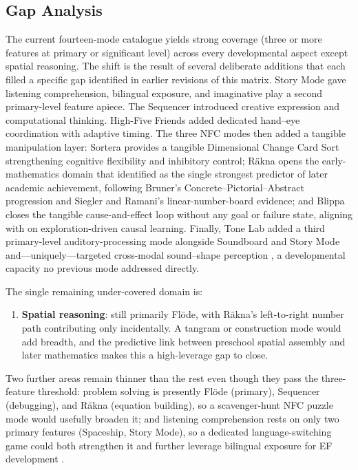 \documentclass[12pt, a4paper]{article}
\begin{document}
\subsection{Gap Analysis}
\label{sec:gaps}

The current fourteen-mode catalogue yields strong coverage (three or more
features at primary or significant level) across every developmental aspect
except spatial reasoning. The shift is the result of several deliberate
additions that each filled a specific gap identified in earlier revisions of
this matrix. Story Mode gave listening comprehension, bilingual exposure, and
imaginative play a second primary-level feature apiece. The Sequencer
introduced creative expression and computational thinking. High-Five Friends
added dedicated hand--eye coordination with adaptive timing. The three NFC
modes then added a tangible manipulation layer: Sortera provides a tangible
Dimensional Change Card Sort \citep{zelazo2006dccs} strengthening cognitive
flexibility and inhibitory control; R\"akna opens the early-mathematics
domain that \citet{duncan2007school} identified as the single strongest
predictor of later academic achievement, following Bruner's
Concrete--Pictorial--Abstract progression \citep{bruner1966instruction} and
Siegler and Ramani's \citeyearpar{siegler2009playing} linear-number-board
evidence; and Blippa closes the tangible cause-and-effect loop without any
goal or failure state, aligning with \citet{bonawitz2011double} on
exploration-driven causal learning. Finally, Tone Lab added a third
primary-level auditory-processing mode alongside Soundboard and Story Mode
and---uniquely---targeted cross-modal sound--shape perception
\citep{kohler1929gestalt, maurer2006shape, dolscheid2014thickness}, a
developmental capacity no previous mode addressed directly.

The single remaining under-covered domain is:

\begin{enumerate}[noitemsep]
  \item \textbf{Spatial reasoning}: still primarily Fl\"ode, with R\"akna's
    left-to-right number path contributing only incidentally. A tangram or
    construction mode would add breadth, and the predictive link between
    preschool spatial assembly and later mathematics
    \citep{verdine2014deconstructing} makes this a high-leverage gap to
    close.
\end{enumerate}

Two further areas remain thinner than the rest even though they pass the
three-feature threshold: problem solving is presently Fl\"ode (primary),
Sequencer (debugging), and R\"akna (equation building), so a scavenger-hunt
NFC puzzle mode would usefully broaden it; and listening comprehension rests
on only two primary features (Spaceship, Story Mode), so a dedicated
language-switching game could both strengthen it and further leverage
bilingual exposure for EF development \citep{bialystok2011reshaping}.
\end{document}
